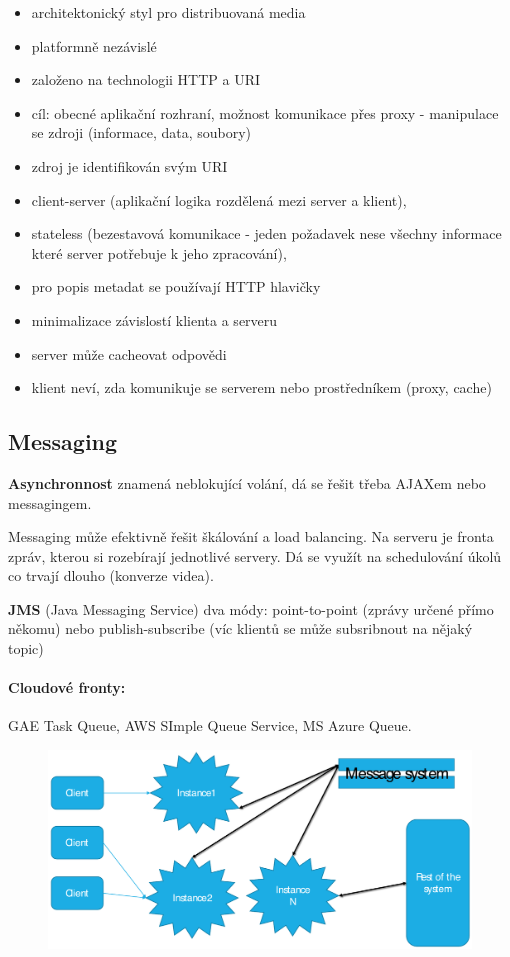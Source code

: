 \begin{itemize}[itemsep=0px]
\item architektonický styl pro distribuovaná media
\item platformně nezávislé
\item založeno na technologii HTTP a URI
\item cíl: obecné aplikační rozhraní, možnost komunikace přes proxy - manipulace se zdroji (informace, data, soubory)
\item zdroj je identifikován svým URI
\item client-server (aplikační logika rozdělená mezi server a klient),
\item stateless (bezestavová komunikace - jeden požadavek nese všechny informace které server potřebuje k jeho zpracování),
\item pro popis metadat se používají HTTP hlavičky
\item minimalizace závislostí klienta a serveru
\item server může cacheovat odpovědi
\item klient neví, zda komunikuje se serverem nebo prostředníkem (proxy, cache)
\end{itemize}

\subsection{Messaging}
\noindent\textbf{Asynchronnost} znamená neblokující volání, dá se řešit třeba AJAXem nebo messagingem.

Messaging může efektivně řešit škálování a load balancing. Na serveru je fronta zpráv, kterou si rozebírají jednotlivé servery. Dá se využít na schedulování úkolů co trvají dlouho (konverze videa).

\textbf{JMS} (Java Messaging Service) dva módy: point-to-point (zprávy určené přímo někomu) nebo publish-subscribe (víc klientů se může subsribnout na nějaký topic)

\paragraph{Cloudové fronty:} GAE Task Queue, AWS SImple Queue Service, MS Azure Queue.

\begin{figure}[h!]
\centering
\includegraphics[width=140mm]{17/images/messaging}
\end{figure}
